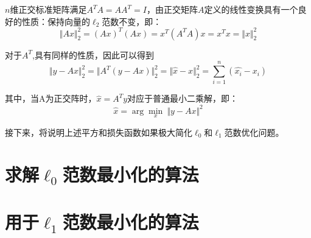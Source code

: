 $ n $维正交标准矩阵满足$ A^T A =AA^T=I$，由正交矩阵$ A $定义的线性变换具有一个良好的性质：保持向量的$ \ell_2 $范数不变，即：
$$  \Vert Ax \Vert_2^2 = (Ax)^T(Ax) =x^T(A^TA)x = x^Tx = \Vert x \Vert_2^2$$

对于$A^T$,具有同样的性质，因此可以得到
$$  \Vert y-Ax \Vert_2^2 = \Vert A^T( y-Ax) \Vert_2^2 = \Vert \hat{x}-x \Vert_2^2 = \sum_{i=1}^n (
\hat{x_i}-x_i)$$

其中，当A为正交阵时，$ \hat{x} = A^T y $对应于普通最小二乘解，即：
\begin{equation}\label{key}
\hat{x} = \arg \min_x \: \Vert y-Ax\Vert^2
\end{equation}

接下来，将说明上述平方和损失函数如果极大简化$ \ell_0 $和$ \ell_1 $范数优化问题。


\section{求解$ \ell_0 $范数最小化的算法}




\section{用于$ \ell_1 $范数最小化的算法}